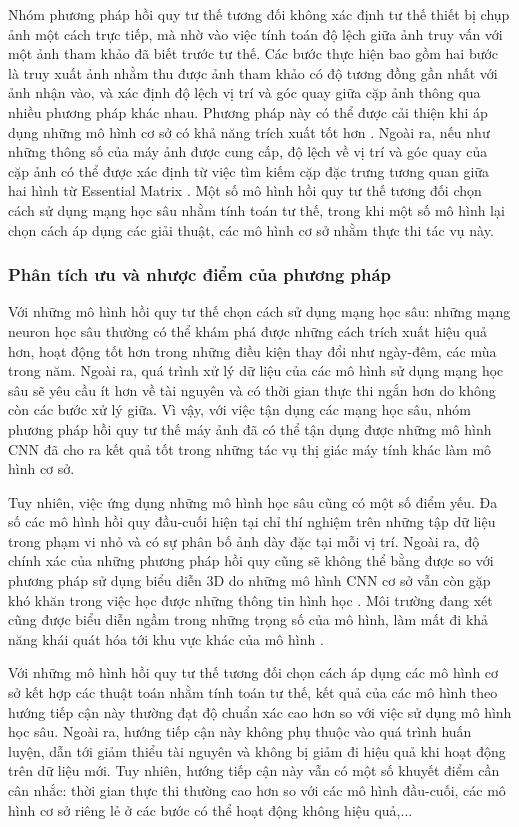 Nhóm phương pháp hồi quy tư thế tương đối không xác định tư thế thiết bị chụp ảnh một cách trực tiếp, mà nhờ vào việc tính toán độ lệch giữa ảnh truy vấn với một ảnh tham khảo đã biết trước tư thế. Các bước thực hiện bao gồm hai bước là truy xuất ảnh nhằm thu được ảnh tham khảo có độ tương đồng gần nhất với ảnh nhận vào, và xác định độ lệch vị trí và góc quay giữa cặp ảnh thông qua nhiều phương pháp khác nhau. Phương pháp này có thể được cải thiện khi áp dụng những mô hình cơ sở có khả năng trích xuất tốt hơn \cite{shavit2023coarse}. Ngoài ra, nếu như những thông số của máy ảnh được cung cấp, độ lệch về vị trí và góc quay của cặp ảnh có thể được xác định từ việc tìm kiếm cặp đặc trưng tương quan giữa hai hình từ Essential Matrix \cite{zhou2020learn}. Một số mô hình hồi quy tư thế tương đối chọn cách sử dụng mạng học sâu nhằm tính toán tư thế, trong khi một số mô hình lại chọn cách áp dụng các giải thuật, các mô hình cơ sở nhằm thực thi tác vụ này.

\subsubsection*{Phân tích ưu và nhược điểm của phương pháp}

Với những mô hình hồi quy tư thế chọn cách sử dụng mạng học sâu: những mạng neuron học sâu thường có thể khám phá được những cách trích xuất hiệu quả hơn, hoạt động tốt hơn trong những điều kiện thay đổi như ngày-đêm, các mùa trong năm. Ngoài ra, quá trình xử lý dữ liệu của các mô hình sử dụng mạng học sâu sẽ yêu cầu ít hơn về tài nguyên và có thời gian thực thi ngắn hơn do không còn các bước xử lý giữa. Vì vậy, với việc tận dụng các mạng học sâu, nhóm phương pháp hồi quy tư thế máy ảnh đã có thể tận dụng được những mô hình CNN đã cho ra kết quả tốt trong những tác vụ thị giác máy tính khác làm mô hình cơ sở.

Tuy nhiên, việc ứng dụng những mô hình học sâu cũng có một số điểm yếu. Đa số các mô hình hồi quy đầu-cuối hiện tại chỉ thí nghiệm trên những tập dữ liệu trong phạm vi nhỏ và có sự phân bố ảnh dày đặc tại mỗi vị trí. Ngoài ra, độ chính xác của những phương pháp hồi quy cũng sẽ không thể bằng được so với phương pháp sử dụng biểu diễn 3D do những mô hình CNN cơ sở vẫn còn gặp khó khăn trong việc học được những thông tin hình học \cite{zhou2020learn}. Môi trường đang xét cũng được biểu diễn ngầm trong những trọng số của mô hình, làm mất đi khả năng khái quát hóa tới khu vực khác của mô hình \cite{sattler2019understanding}.

Với những mô hình hồi quy tư thế tương đối chọn cách áp dụng các mô hình cơ sở kết hợp các thuật toán nhằm tính toán tư thế, kết quả của các mô hình theo hướng tiếp cận này thường đạt độ chuẩn xác cao hơn so với việc sử dụng mô hình học sâu. Ngoài ra, hướng tiếp cận này không phụ thuộc vào quá trình huấn luyện, dẫn tới giảm thiểu tài nguyên và không bị giảm đi hiệu quả khi hoạt động trên dữ liệu mới. Tuy nhiên, hướng tiếp cận này vẫn có một số khuyết điểm cần cân nhắc: thời gian thực thi thường cao hơn so với các mô hình đầu-cuối, các mô hình cơ sở riêng lẻ ở các bước có thể hoạt động không hiệu quả,...

